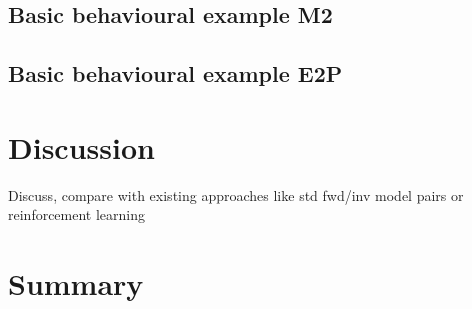 \documentclass[11pt]{llncs}
\begin{document}
\subsection{Basic behavioural example M2}
\label{sec:exprs_basic_ex_m2}
\subsection{Basic behavioural example E2P}
\label{sec:exprs_basic_ex_e2p}



\section{Discussion}
\label{sec:orga3d6260}

Discuss, compare with existing approaches like std fwd/inv model
  pairs or reinforcement learning

\section{Summary}
\label{sec:orgc71dbe7}


\listoffigures

\printbibliography
\end{document}
